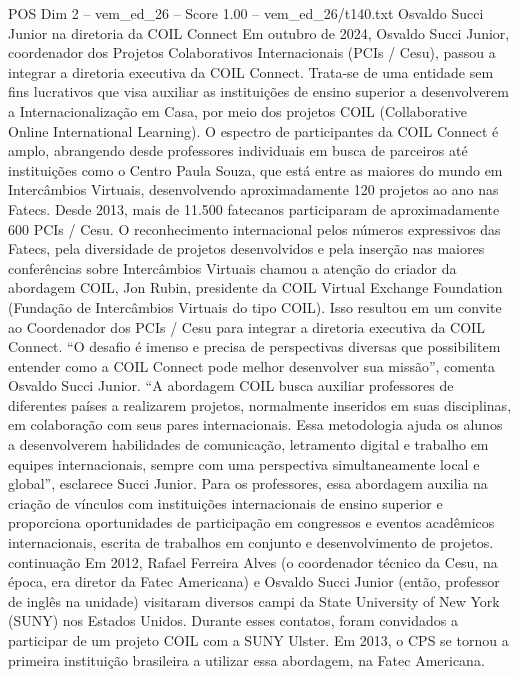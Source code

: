 \begin{textsample}{POS Dim 2 – vem\_ed\_26 – Score 1.00 – vem\_ed\_26/t140.txt}  \label{ex:f2_pos_034}
Osvaldo Succi Junior na diretoria da COIL Connect Em outubro de 2024, Osvaldo Succi Junior, coordenador dos Projetos Colaborativos Internacionais (PCIs / Cesu), passou a integrar a diretoria executiva da COIL Connect.
Trata-se de uma entidade sem fins lucrativos que visa auxiliar as instituições de ensino superior a desenvolverem a Internacionalização em Casa, por meio dos projetos COIL (Collaborative Online International Learning).
O espectro de participantes da COIL Connect é amplo, abrangendo desde professores individuais em busca de parceiros até instituições como o Centro Paula Souza, que está entre as maiores do mundo em Intercâmbios Virtuais, desenvolvendo aproximadamente 120 projetos ao ano nas Fatecs.
Desde 2013, mais de 11.500 fatecanos participaram de aproximadamente 600 PCIs / Cesu.
O reconhecimento internacional pelos números expressivos das Fatecs, pela diversidade de projetos desenvolvidos e pela inserção nas maiores conferências sobre Intercâmbios Virtuais chamou a atenção do criador da abordagem COIL, Jon Rubin, presidente da COIL Virtual Exchange Foundation (Fundação de Intercâmbios Virtuais do tipo COIL).
Isso resultou em um convite ao Coordenador dos PCIs / Cesu para integrar a diretoria executiva da COIL Connect. “O desafio é imenso e precisa de perspectivas diversas que possibilitem entender como a COIL Connect pode melhor desenvolver sua missão”, comenta Osvaldo Succi Junior. “A abordagem COIL busca auxiliar professores de diferentes países a realizarem projetos, normalmente inseridos em suas disciplinas, em colaboração com seus pares internacionais.
Essa metodologia ajuda os alunos a desenvolverem habilidades de comunicação, letramento digital e trabalho em equipes internacionais, sempre com uma perspectiva simultaneamente local e global”, esclarece Succi Junior.
Para os professores, essa abordagem auxilia na criação de vínculos com instituições internacionais de ensino superior e proporciona oportunidades de participação em congressos e eventos acadêmicos internacionais, escrita de trabalhos em conjunto e desenvolvimento de projetos. continuação Em 2012, Rafael Ferreira Alves (o coordenador técnico da Cesu, na época, era diretor da Fatec Americana) e Osvaldo Succi Junior (então, professor de inglês na unidade) visitaram diversos campi da State University of New York (SUNY) nos Estados Unidos.
Durante esses contatos, foram convidados a participar de um projeto COIL com a SUNY Ulster.
Em 2013, o CPS se tornou a primeira instituição brasileira a utilizar essa abordagem, na Fatec Americana.

\end{textsample}
